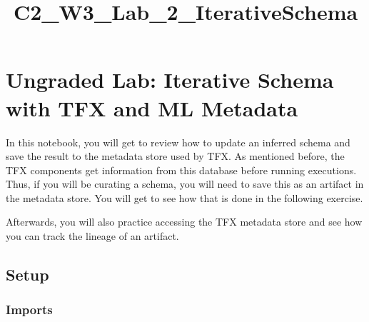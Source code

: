\documentclass[11pt]{article}
\title{C2\_W3\_Lab\_2\_IterativeSchema}
\begin{document}
    
    \maketitle
    
    

    
    \hypertarget{ungraded-lab-iterative-schema-with-tfx-and-ml-metadata}{%
\section{Ungraded Lab: Iterative Schema with TFX and ML
Metadata}\label{ungraded-lab-iterative-schema-with-tfx-and-ml-metadata}}

In this notebook, you will get to review how to update an inferred
schema and save the result to the metadata store used by TFX. As
mentioned before, the TFX components get information from this database
before running executions. Thus, if you will be curating a schema, you
will need to save this as an artifact in the metadata store. You will
get to see how that is done in the following exercise.

Afterwards, you will also practice accessing the TFX metadata store and
see how you can track the lineage of an artifact.

    \hypertarget{setup}{%
\subsection{Setup}\label{setup}}

    \hypertarget{imports}{%
\subsubsection{Imports}\label{imports}}
\end{document}
